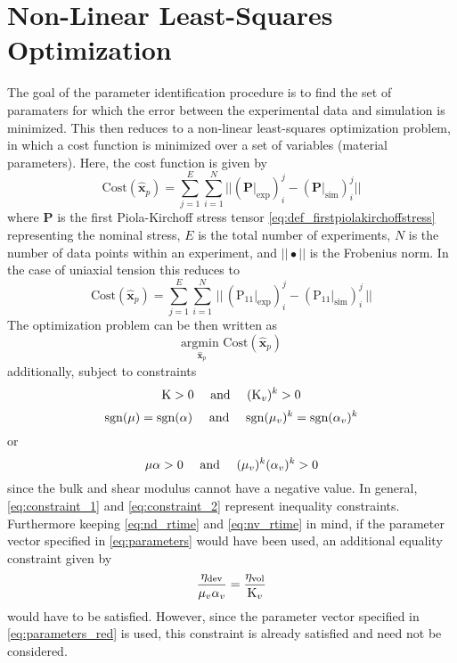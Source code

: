 \section{Non-Linear Least-Squares Optimization}
The goal of the parameter identification procedure is to find the set of paramaters for which the error between the experimental data and simulation is minimized. This then reduces to a non-linear least-squares optimization problem, in which a cost function is minimized over a set of variables (material parameters). Here, the cost function is given by 
\begin{equation}
    \text{Cost}({\hat{\bm{x}}_p}) = \sum_{j=1}^{E} \sum_{i=1}^{N} \big|\big|(\mathbf{P}{|}_{\text{exp}})^{j}_{i} - (\mathbf{P}{|}_{\text{sim}})^{j}_{i} \big|\big|
\end{equation}
where \(\mathbf{P}\) is the first Piola-Kirchoff stress tensor \cref{eq:def_firstpiolakirchoffstress} representing the nominal stress, \(E\) is the total number of experiments, \(N\) is the number of data points within an experiment, and \(||\bullet||\) is the Frobenius norm. In the case of uniaxial tension this reduces to 
\begin{equation}
    \text{Cost}({\hat{\bm{x}}_p}) = \sum_{j=1}^{E} \sum_{i=1}^{N} \,\big|\big|\,(\mathrm{P_{11}}{|}_{\text{exp}})^{j}_{i} - (\mathrm{P}_{11}{|}_{\text{sim}})^{j}_{i}\,\big|\big|
\end{equation}
The optimization problem can be then written as
\begin{equation}
   \underset{{\hat{\bm{x}}_p}}{\text{argmin }} \text{Cost}({\hat{\bm{x}}_p})
   \label{eq:constrained_optimization_cost}
\end{equation}
additionally, subject to constraints 
\begin{equation}
    \mathrm{K}> 0 \quad \text{ and } \quad (\mathrm{K}_{v})^{k} > 0
    \label{eq:constraint_1}
\end{equation}
\begin{equation*}
    \mathrm{sgn}(\mu) = \text{sgn}(\alpha)  \quad \text{ and } \quad \mathrm{sgn}(\mu_{v})^{k} = \text{sgn}(\alpha_{v})^{k}
\end{equation*}
or 
\begin{equation}
\mu \alpha > 0 \quad \text{ and } \quad (\mu_{v})^{k}(\alpha_{v})^{k} > 0
\label{eq:constraint_2}
\end{equation}
since the bulk and shear modulus cannot have a negative value. In general, \cref{eq:constraint_1}  and \cref{eq:constraint_2} represent inequality constraints. Furthermore keeping \cref{eq:nd_rtime} and \cref{eq:nv_rtime} in mind, if the parameter vector specified in \cref{eq:parameters} would have been used, an additional equality constraint given by 
\begin{equation}
    \frac{\eta_{\text{dev}}}{\mu_{v} \alpha_{v}} = \frac{\eta_{\text{vol}}}{\mathrm{K}_{v}}
\end{equation}
would have to be satisfied. However, since the parameter vector specified in \cref{eq:parameters_red} is used, this constraint is already satisfied and need not be considered.

